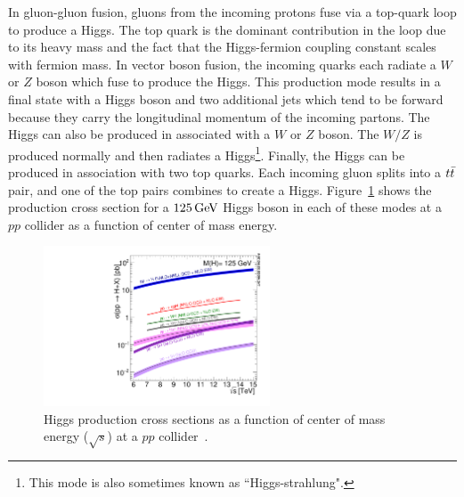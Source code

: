 In gluon-gluon fusion, gluons from the incoming protons fuse via a top-quark loop to produce a Higgs. The top quark is the dominant contribution in the loop due to its heavy mass and the fact that the Higgs-fermion coupling constant scales with fermion mass. In vector boson fusion, the incoming quarks each radiate a $W$ or $Z$ boson which fuse to produce the Higgs. This production mode results in a final state with a Higgs boson and two additional jets which tend to be forward because they carry the longitudinal momentum of the incoming partons. The Higgs can also be produced in associated with a $W$ or $Z$ boson. The $W/Z$ is produced normally and then radiates a Higgs\footnote{This mode is also sometimes known as ``Higgs-strahlung".}. Finally, the Higgs can be produced in association with two top quarks. Each incoming gluon splits into a $t\bar{t}$ pair, and one of the top pairs combines to create a Higgs. Figure~\ref{fig:Higgs_xsec} shows the production cross section for a $125 \GeV$ Higgs boson in each of these modes at a $pp$ collider as a function of center of mass energy. 
%
\begin{figure}[h!]
  \centering
  \captionsetup{justification=centering}

  \includegraphics[width=0.6\textwidth,angle=270]{figures/h125_xsec}
  \caption{Higgs production cross sections as a function of center of mass energy ($\sqrt{s}$) at a $pp$ collider~\cite{LHCXSWG}.}
  \label{fig:Higgs_xsec}
\end{figure}
%
